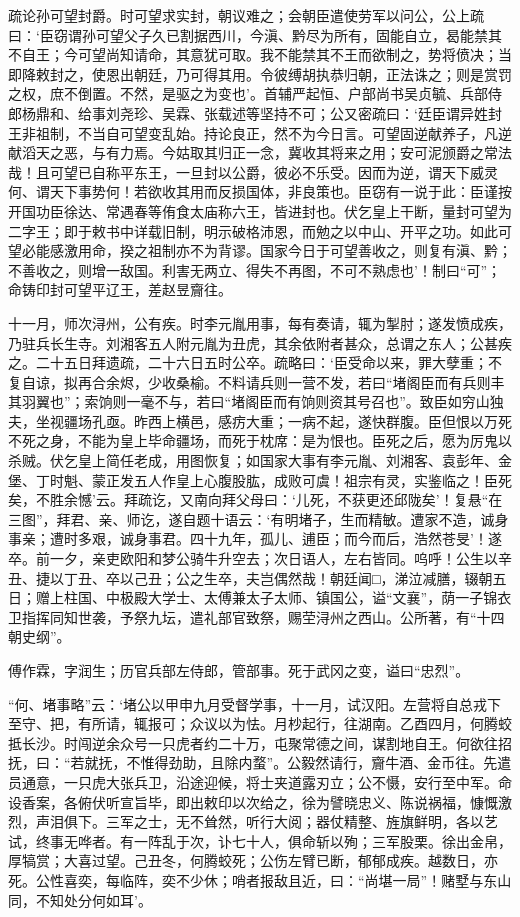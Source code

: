 \documentclass[]{article}
\begin{document}
疏论孙可望封爵。时可望求实封，朝议难之；会朝臣遣使劳军以问公，公上疏曰：`臣窃谓孙可望父子久已割据西川，今滇、黔尽为所有，固能自立，曷能禁其不自王；今可望尚知请命，其意犹可取。我不能禁其不王而欲制之，势将偾决；当即降敕封之，使恩出朝廷，乃可得其用。令彼缚胡执恭归朝，正法诛之；则是赏罚之权，庶不倒置。不然，是驱之为变也'。首辅严起恒、户部尚书吴贞毓、兵部侍郎杨鼎和、给事刘尧珍、吴霖、张载述等坚持不可；公又密疏曰：`廷臣谓异姓封王非祖制，不当自可望变乱始。持论良正，然不为今日言。可望固逆献养子，凡逆献滔天之恶，与有力焉。今姑取其归正一念，冀收其将来之用；安可泥颁爵之常法哉！且可望已自称平东王，一旦封以公爵，彼必不乐受。因而为逆，谓天下威灵何、谓天下事势何！若欲收其用而反损国体，非良策也。臣窃有一说于此：臣谨按开国功臣徐达、常遇春等侑食太庙称六王，皆进封也。伏乞皇上干断，量封可望为二字王；即于敕书中详载旧制，明示破格沛恩，而勉之以中山、开平之功。如此可望必能感激用命，揆之祖制亦不为背谬。国家今日于可望善收之，则复有滇、黔；不善收之，则增一敌国。利害无两立、得失不再图，不可不熟虑也'！制曰``可''；命铸印封可望平辽王，差赵昱齎往。

十一月，师次浔州，公有疾。时李元胤用事，每有奏请，辄为掣肘；遂发愤成疾，乃驻兵长生寺。刘湘客五人附元胤为丑虎，其余依附者甚众，总谓之东人；公甚疾之。二十五日拜遗疏，二十六日五时公卒。疏略曰：`臣受命以来，罪大孽重；不复自谅，拟再合余烬，少收桑榆。不料请兵则一营不发，若曰``堵阁臣而有兵则丰其羽翼也''；索饷则一毫不与，若曰``堵阁臣而有饷则资其号召也''。致臣如穷山独夫，坐视疆场孔亟。昨西上横邑，感疠大重；一病不起，遂快群腹。臣但恨以万死不死之身，不能为皇上毕命疆场，而死于枕席：是为恨也。臣死之后，愿为厉鬼以杀贼。伏乞皇上简任老成，用图恢复；如国家大事有李元胤、刘湘客、袁彭年、金堡、丁时魁、蒙正发五人作皇上心腹股肱，成败可虞！祖宗有灵，实鉴临之！臣死矣，不胜余憾'云。拜疏讫，又南向拜父母曰：`儿死，不获更还邱陇矣'！复悬``在三图''，拜君、亲、师讫，遂自题十语云：`有明堵子，生而精敏。遭家不造，诚身事亲；遭时多艰，诚身事君。四十九年，孤儿、逋臣；而今而后，浩然苍旻'！遂卒。前一夕，亲吏欧阳和梦公骑牛升空去；次日语人，左右皆同。呜呼！公生以辛丑、捷以丁丑、卒以己丑；公之生卒，夫岂偶然哉！朝廷闻□，涕泣减膳，辍朝五日；赠上柱国、中极殿大学士、太傅兼太子太师、镇国公，谥``文襄''，荫一子锦衣卫指挥同知世袭，予祭九坛，遣礼部官致祭，赐茔浔州之西山。公所著，有``十四朝史纲''。

傅作霖，字润生；历官兵部左侍郎，管部事。死于武冈之变，谥曰``忠烈''。

``何、堵事略''云：`堵公以甲申九月受督学事，十一月，试汉阳。左营将自总戎下至守、把，有所请，辄报可；众议以为怯。月杪起行，往湖南。乙酉四月，何腾蛟抵长沙。时闯逆余众号一只虎者约二十万，屯聚常德之间，谋割地自王。何欲往招抚，曰：``若就抚，不惟得劲助，且除内蝥''。公毅然请行，齎牛酒、金币往。先遣员通意，一只虎大张兵卫，沿途迎候，将士夹道露刃立；公不慑，安行至中军。命设香案，各俯伏听宣旨毕，即出敕印以次给之，徐为譬晓忠义、陈说祸福，慷慨激烈，声泪俱下。三军之士，无不耸然，听行大阅；器仗精整、旌旗鲜明，各以艺试，终事无哗者。有一阵乱于次，讣七十人，俱命斩以殉；三军股栗。徐出金帛，厚犒赏；大喜过望。己丑冬，何腾蛟死；公伤左臂已断，郁郁成疾。越数日，亦死。公性喜奕，每临阵，奕不少休；哨者报敌且近，曰：``尚堪一局''！赌墅与东山同，不知处分何如耳'。
\end{document}
